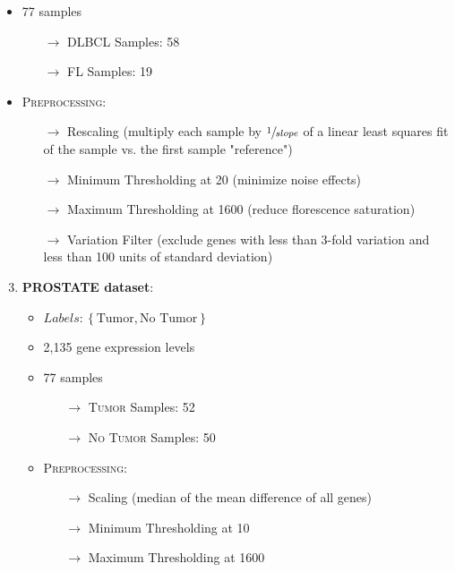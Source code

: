\documentclass[serif]{beamer}
\begin{document}
\begin{frame}[t]
{\begin{enumerate}
\begin{itemize}
					\item 77 samples
					\begin{itemize}
						\item[$\rightarrow$] \textsc{DLBCL} Samples: 58
						\item[$\rightarrow$] \textsc{FL} Samples: 19
					\end{itemize}
					\item  \textsc{Preprocessing:}
					\begin{itemize}
						\item[$\rightarrow$]  Rescaling (multiply each sample by $\sfrac{1}{slope}$ of
						a linear least squares fit of the sample vs. the first sample "reference")
						\item[$\rightarrow$]  Minimum Thresholding at 20 (minimize noise effects)
						\item[$\rightarrow$]  Maximum Thresholding at 1600 (reduce florescence saturation)
						\item[$\rightarrow$]  Variation Filter (exclude genes with less than 3-fold variation and less than 100 units of standard deviation)
					\end{itemize}
				\end{itemize}
		\end{enumerate}
		}
		{
		\begin{enumerate}
			\setcounter{enumi}{2}
			\item {\bf PROSTATE dataset}:
				\begin{itemize}
					\item  $ Labels: \left \{ \text{Tumor}, \text{No Tumor}  \right \}$
					\item 2,135 gene expression levels
					\item  77 samples
					\begin{itemize}
						\item[$\rightarrow$]  \textsc{Tumor} Samples: 52
						\item[$\rightarrow$]  \textsc{No Tumor} Samples: 50
					\end{itemize}					
					\item  \textsc{Preprocessing:}
					\begin{itemize}
						\item[$\rightarrow$]  Scaling (median of the mean difference of all genes)
						\item[$\rightarrow$]  Minimum Thresholding at 10
						\item[$\rightarrow$]  Maximum Thresholding at 1600
					\end{itemize}

\end{itemize}
\end{enumerate}}
\end{frame}
\end{document}
